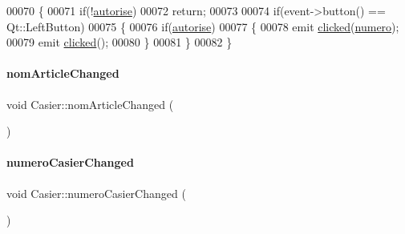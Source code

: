 \begin{DoxyCode}
00070 \{
00071     \textcolor{keywordflow}{if}(!\hyperlink{class_casier_a2dd9fbe4a93685080a9b5c8f69e3f29a}{autorise})
00072         \textcolor{keywordflow}{return};
00073 
00074     \textcolor{keywordflow}{if}(event->button() == Qt::LeftButton)
00075     \{
00076         \textcolor{keywordflow}{if}(\hyperlink{class_casier_a2dd9fbe4a93685080a9b5c8f69e3f29a}{autorise})
00077         \{
00078             emit \hyperlink{class_casier_a6f147d5151d266424cc84b114ccf073b}{clicked}(\hyperlink{class_casier_a17aa23e73b177559266a9fb17f63b812}{numero});
00079             emit \hyperlink{class_casier_a6f147d5151d266424cc84b114ccf073b}{clicked}();
00080         \}
00081     \}
00082 \}
\end{DoxyCode}
\mbox{\label{class_casier_a736c4258ae979ad948ee3899545c317b}} 
\paragraph{\texorpdfstring{nom\+Article\+Changed}{nomArticleChanged}}
{\footnotesize\ttfamily void Casier\+::nom\+Article\+Changed (\begin{DoxyParamCaption}{ }\end{DoxyParamCaption})\hspace{0.3cm}{\ttfamily [signal]}}

\mbox{\label{class_casier_a1680f30d5ac866684ff0eb72a1415e3a}} 
\paragraph{\texorpdfstring{numero\+Casier\+Changed}{numeroCasierChanged}}
{\footnotesize\ttfamily void Casier\+::numero\+Casier\+Changed (\begin{DoxyParamCaption}{ }\end{DoxyParamCaption})\hspace{0.3cm}{\ttfamily [signal]}}

\mbox{\label{class_casier_ac4b0de3ba58dc2bab52b049b278f4f90}} 
